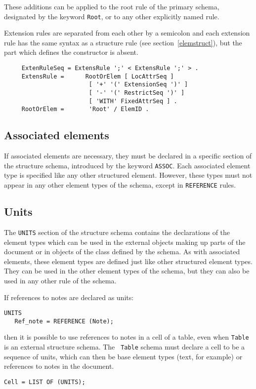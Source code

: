 These additions can be applied to the root rule of the primary schema,
designated by the keyword {\tt Root}, or to any other explicitly named
rule.

Extension rules are separated from each other by a semicolon and each
extension rule has the same syntax as a structure rule (see
section~\ref{elemstruct}), but the part which defines the constructor
is absent.

\begin{verbatim}
     ExtenRuleSeq = ExtensRule ';' < ExtensRule ';' > .
     ExtensRule =      RootOrElem [ LocAttrSeq ]
                        [ '+' '(' ExtensionSeq ')' ]
                        [ '-' '(' RestrictSeq ')' ]
                        [ 'WITH' FixedAttrSeq ] .
     RootOrElem =       'Root' / ElemID .
\end{verbatim}

\subsection{Associated elements}

If associated elements are necessary, they must be declared in a
specific section of the structure schema, introduced by the keyword
{\tt ASSOC}.  Each associated element type is specified like any other
structured element.  However, these types must not appear in any other
element types of the schema, except in {\tt REFERENCE} rules.

\subsection{Units}
\label{uniteslog}

The {\tt UNITS} section of the structure schema contains the
declarations of the element types which can be used in the external
objects making up parts of the document or in objects of the class
defined by the schema.  As with associated elements, these
element types are defined just like other structured element types.
They can be used in the other element types of the schema, but they can
also be used in any other rule of the schema.

\begin{example}
If references to notes are declared as units:
\begin{verbatim}
UNITS
   Ref_note = REFERENCE (Note);
\end{verbatim}
then it is possible to use references to notes in a cell of a table,
even when {\tt Table} is an external structure schema.  The {\tt
Table} schema must declare a cell to be a sequence of units, which can
then be base element types (text, for example) or references to notes
in the document.
\begin{verbatim}
Cell = LIST OF (UNITS);
\end{verbatim}
\end{example}

